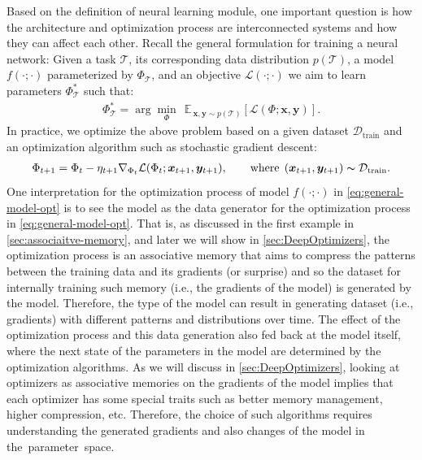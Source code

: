 \documentclass{article}
\newcommand{\head}[1]{\vspace{1.7mm}\noindent{{\textcolor{c4}{\bf #1.}}}}
\newcommand{\vx}{\boldsymbol{x}}
\begin{document}
\head{Neural Learning Modules are Inter-connected Systems}  
Based on the definition of neural learning module, one important question is how the architecture and optimization process are interconnected systems and how they can affect each other. Recall the general formulation for training a neural network: Given a task $\mathcal{T}$, its corresponding data distribution $p(\mathcal{T})$, a model $f(\cdot; \cdot)$ parameterized by $\Phi_{\mathcal{T}}$, and an objective $\mathcal{L}(\cdot; \cdot)$ we aim to learn parameters $\Phi^{*}_{\mathcal{T}}$ such that:
\begin{align}
    \Phi^{*}_{\mathcal{T}} = \arg \min_{\Phi}\: \:\mathbb{E}_{\:\vx, \boldsymbol{y} \sim p(\mathcal{T})} \left[ \mathcal{L}\left(\Phi; \vx, \boldsymbol{y}\right) \right].
\end{align}
In practice, we optimize the above problem based on a given dataset $\mathcal{D}_{\text{train}}$ and an optimization algorithm such as stochastic gradient descent:
\begin{align}\label{eq:general-model-opt}
    \Phi_{t+1} = \Phi_{t} - \eta_{t+1} \nabla_{\Phi_t} \mathcal{L}(\Phi_t; \vx_{t+1}, \boldsymbol{y}_{t+1}), \qquad \text{where}\:\: (\vx_{t+1}, \boldsymbol{y}_{t+1}) \thicksim \mathcal{D}_{\text{train}}.
\end{align}
One interpretation for the optimization process of model $f(\cdot; \cdot)$ in \autoref{eq:general-model-opt} is to see the model as the data generator for the optimization process in \autoref{eq:general-model-opt}. That is, as discussed in the first example in \autoref{sec:associaitve-memory}, and later we will show in \autoref{sec:DeepOptimizers}, the optimization process is an associative memory that aims to compress the patterns between the training data and its gradients (or surprise) and so the dataset for internally training such memory (i.e., the gradients of the model) is generated by the model. Therefore, the type of the model can result in generating dataset (i.e., gradients) with different patterns and distributions over time. The effect of the optimization process and this data generation also fed back at the model itself, where the next state of the parameters in the model are determined by the optimization algorithms. As we will discuss in \autoref{sec:DeepOptimizers}, looking at optimizers as associative memories on the gradients of the model implies that each optimizer has some special traits such as better memory management, higher compression, etc. Therefore, the choice of such algorithms requires understanding the generated gradients and also changes of the model in the~parameter~space. 
\end{document}
